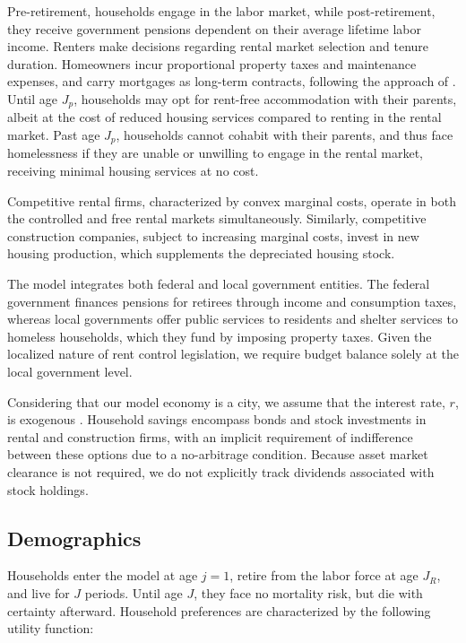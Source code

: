 \documentclass[parskip=full]{article}
\begin{document}
Pre-retirement, households engage in the labor market, while post-retirement, they receive government pensions dependent on their average lifetime labor income. Renters make decisions regarding rental market selection and tenure duration. Homeowners incur proportional property taxes and maintenance expenses, and carry mortgages as long-term contracts, following the approach of \citet{kkk-2021}. Until age $J_{p}$, households may opt for rent-free accommodation with their parents, albeit at the cost of reduced housing services compared to renting in the rental market. Past age $J_{p}$, households cannot cohabit with their parents, and thus face homelessness if they are unable or unwilling to engage in the rental market, receiving minimal housing services at no cost.

Competitive rental firms, characterized by convex marginal costs, operate in both the controlled and free rental markets simultaneously. Similarly, competitive construction companies, subject to increasing marginal costs, invest in new housing production, which supplements the depreciated housing stock.

The model integrates both federal and local government entities. The federal government finances pensions for retirees through income and consumption taxes, whereas local governments offer public services to residents and shelter services to homeless households, which they fund by imposing property taxes. Given the localized nature of rent control legislation, we require budget balance solely at the local government level.

Considering that our model economy is a city, we assume that the interest rate, $r$, is exogenous \citep{sommeretal-2013, arslanetal-2015, sommersullivan-2017, kaplanetal-2019}. Household savings encompass bonds and stock investments in rental and construction firms, with an implicit requirement of indifference between these options due to a no-arbitrage condition. Because asset market clearance is not required, we do not explicitly track dividends associated with stock holdings. 

\subsection{Demographics}\label{subsection:demographics}

Households enter the model at age $j=1$, retire from the labor force at age $J_{R}$, and live for $J$ periods. Until age $J$, they face no mortality risk, but die with certainty afterward. Household preferences are characterized by the following utility function:
\end{document}
